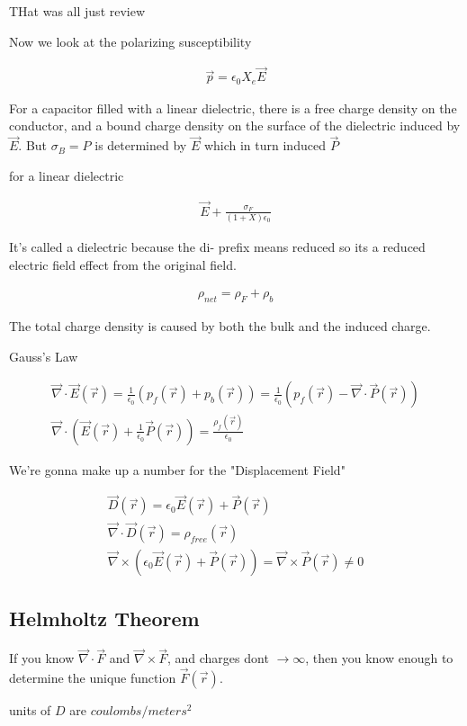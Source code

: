 \documentclass[fleqn]{report}
\newcommand{\equations} [1] {
\begin{gather*}
#1
\end{gather*}
}
\begin{document}
THat was all just review 

Now we look at the polarizing susceptibility
\equations{
    \vec p 
    =
    \epsilon_0 X_e \vec E
}


For a capacitor filled with a linear dielectric, there is a 
free charge density on the conductor, and a bound charge density on the 
surface of the dielectric induced by $\vec E$. But $\sigma_B = P$ is 
determined by $\vec E$ which in turn induced $\vec P$ 

for a linear dielectric 
\equations{
    \vec E + \frac{\sigma_F}{(1 + X) \epsilon_0}
}

It's called a dielectric because the di- prefix means reduced so its a reduced 
electric field effect from the original field. 

\equations{
    \rho_{net} = \rho_F + \rho_b
}
The total charge density is caused by both the bulk and the induced charge. 

Gauss's Law 
\equations{
    \vec \nabla \cdot \vec E(\vec r)
    =
    \frac{1}{\epsilon_0}
    \left(
        p_f(\vec r)
        +
        p_b(\vec r)
    \right)
    =
    \frac{1}{\epsilon_0}
    \left(
        p_f(\vec r)
        -
        \vec \nabla \cdot \vec P(\vec r)
    \right)
    \\
    \vec \nabla \cdot 
    \left(
        \vec E(\vec r)
        +
        \frac{1}{\epsilon_0}
        \vec P(\vec r)
    \right)
    =
    \frac{\rho_f(\vec r)}{\epsilon_0}
}

We're gonna make up a number for the "Displacement Field"


\equations{
    \vec D(\vec r)
    =
    \epsilon_0 
    \vec E(\vec r)
    + 
    \vec P(\vec r)
    \\
    \vec \nabla \cdot \vec D(\vec r) 
    =
    \rho_{free}(\vec r)
    \\
    \vec \nabla 
    \times
    \left(
        \epsilon_0
        \vec E(\vec r)
        +
        \vec P(\vec r)
    \right)
    =
    \vec \nabla \times \vec P(\vec r)
    \neq 0
}


\subsection{Helmholtz Theorem}
If you know $\vec \nabla \cdot \vec F$ and $\vec \nabla \times \vec F$, 
and charges dont $\to \infty$, then you know enough to determine 
the unique function $\vec F(\vec r)$.

units of $D$ are $coulombs/meters^2$
\end{document}

